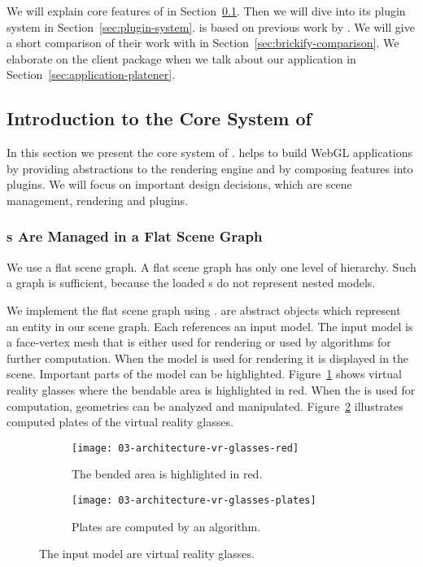 \documentclass[../../ClassicThesis.tex]{subfiles}
\begin{document}
We will explain core features of {\convertify} in
Section~\ref{sec:convertify-core-features}. Then we will dive into
its plugin system in Section~\ref{sec:plugin-system}. {\convertify} is
based on previous work by \citeauthor{bachelor-thesis}. We will give a
short comparison of their work with {\convertify} in
Section~\ref{sec:brickify-comparison}. We elaborate on the client
package when we talk about our application {\platener} in
Section~\ref{sec:application-platener}.

\subsection{Introduction to the Core System of {\convertify}}
\label{sec:convertify-core-features}

In this section we present the core system of {\convertify}.
{\convertify} helps to build WebGL applications by providing
abstractions to the rendering engine and by composing
features into plugins. We will focus on important design
decisions, which are scene management, rendering and
plugins.

\subsubsection{{\threedmodel}s Are Managed in a Flat Scene
  Graph}

We use a flat scene graph. A flat scene graph has only one
level of hierarchy. Such a graph is sufficient, because the
loaded {\stlfile}s do not represent nested models.

We implement the flat scene graph using .
 are abstract objects which represent an entity
in our scene graph. Each  references an input
model. The input model is a face-vertex mesh that is either
used for rendering or used by algorithms for further
computation. When the model is used for rendering it is
displayed in the scene. Important parts of the model can be
highlighted. Figure~\ref{fig:vr-glasses:red} shows virtual
reality glasses where the bendable area is highlighted in
red. When the {\threedmodel} is used for computation,
geometries can be analyzed and manipulated.
Figure~\ref{fig:vr-glasses:plates} illustrates computed
plates of the virtual reality glasses.

\begin{figure}[h]
  \centering
  \begin{subfigure}[a]{0.49\textwidth}
    \texttt{[image: 03-architecture-vr-glasses-red]}
    \caption{The bended area is highlighted in red.}
    \label{fig:vr-glasses:red}
  \end{subfigure}
  \begin{subfigure}[b]{0.49\textwidth}
    \texttt{[image: 03-architecture-vr-glasses-plates]}
    \caption{Plates are computed by an algorithm.}
    \label{fig:vr-glasses:plates}
  \end{subfigure}
  \caption{The input model are virtual reality glasses.}
  \label{fig:vr-glasses}
\end{figure}
\end{document}
